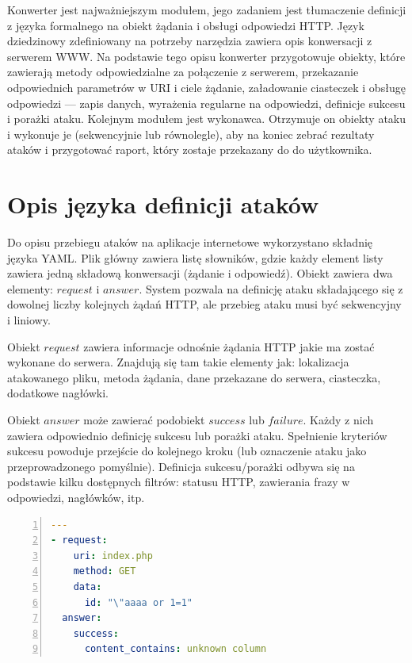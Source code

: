 \documentclass[11pt,a4paper,polish,thesis]{dcsbook}
\begin{document}
Konwerter jest najważniejszym modułem, jego zadaniem jest tłumaczenie definicji z języka formalnego na obiekt żądania i obsługi odpowiedzi HTTP. Język dziedzinowy zdefiniowany na potrzeby narzędzia zawiera opis konwersacji z serwerem WWW. Na podstawie tego opisu konwerter przygotowuje obiekty, które zawierają metody odpowiedzialne za połączenie z serwerem, przekazanie odpowiednich parametrów w URI i ciele żądanie, załadowanie ciasteczek i obsługę odpowiedzi --- zapis danych, wyrażenia regularne na odpowiedzi, definicje sukcesu i porażki ataku.
Kolejnym modułem jest wykonawca. Otrzymuje on obiekty ataku i wykonuje je (sekwencyjnie lub równolegle), aby na koniec zebrać rezultaty ataków i przygotować raport, który zostaje przekazany do do użytkownika.
 
\section{Opis języka definicji ataków} 
Do opisu przebiegu ataków na aplikacje internetowe wykorzystano składnię języka YAML.
Plik główny zawiera listę słowników, gdzie każdy element listy zawiera jedną składową konwersacji (żądanie i odpowiedź). Obiekt zawiera dwa elementy: $request$ i $answer$. System pozwala na definicję ataku składającego się z dowolnej liczby kolejnych żądań HTTP, ale przebieg ataku musi być sekwencyjny i liniowy.

Obiekt $request$ zawiera informacje odnośnie żądania HTTP jakie ma zostać wykonane do serwera. Znajdują się tam takie elementy jak: lokalizacja atakowanego pliku, metoda żądania, dane przekazane do serwera, ciasteczka, dodatkowe nagłówki.

Obiekt $answer$ może zawierać podobiekt $success$ lub $failure$. Każdy z nich zawiera odpowiednio definicję sukcesu lub porażki ataku. Spełnienie kryteriów sukcesu powoduje przejście do kolejnego kroku (lub oznaczenie ataku jako przeprowadzonego pomyślnie). Definicja sukcesu/porażki odbywa się na podstawie kilku dostępnych filtrów: statusu HTTP, zawierania frazy w odpowiedzi, nagłówków, itp.


\begin{lstlisting}[language=YAML,frame=single,label=def1,numbers=left,caption=przykład podstawowej definicji ataku]
---
- request:
    uri: index.php
    method: GET
    data:
      id: "\"aaaa or 1=1"
  answer:
    success:
      content_contains: unknown column
\end{lstlisting}
\end{document}
